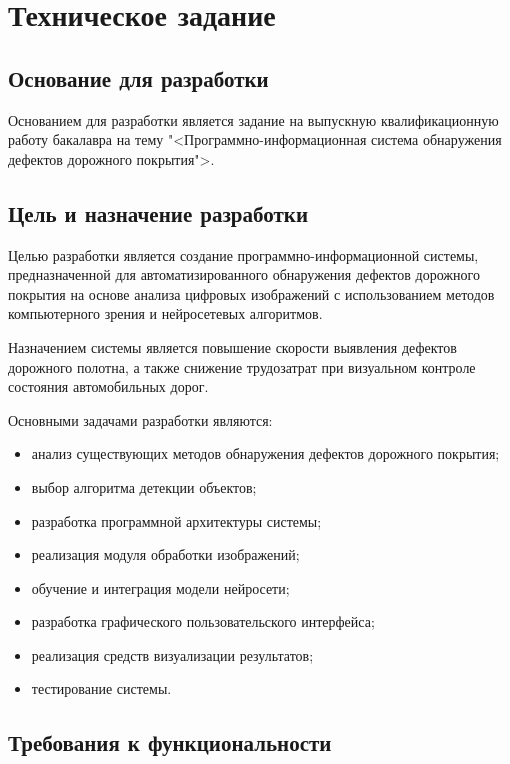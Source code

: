 \section{Техническое задание}
\subsection{Основание для разработки}

Основанием для разработки является задание на выпускную квалификационную работу бакалавра на тему "<Программно-информационная система обнаружения дефектов дорожного покрытия">.

\subsection{Цель и назначение разработки}

Целью разработки является создание программно-информационной системы, предназначенной для автоматизированного обнаружения дефектов дорожного покрытия на основе анализа цифровых изображений с использованием методов компьютерного зрения и нейросетевых алгоритмов.

Назначением системы является повышение скорости выявления дефектов дорожного полотна, а также снижение трудозатрат при визуальном контроле состояния автомобильных дорог.

Основными задачами разработки являются:

\begin{itemize}
	\item анализ существующих методов обнаружения дефектов дорожного покрытия;
	\item выбор алгоритма детекции объектов;
	\item разработка программной архитектуры системы;
	\item реализация модуля обработки изображений;
	\item обучение и интеграция модели нейросети;
	\item разработка графического пользовательского интерфейса;
	\item реализация средств визуализации результатов;
	\item тестирование системы.
\end{itemize}

\subsection{Требования к функциональности}

